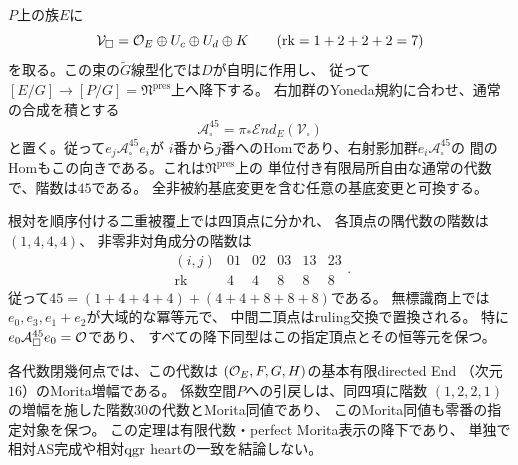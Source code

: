\begin{theorem}[無標識二形式商上の階数四十五のpointed有限代数]
\label{thm:qa-unordered-rank45-morita-descent}
$P$上の族$E$に
\[
 \mathcal V_\square
 =\mathcal O_E\oplus U_c\oplus U_d\oplus K
 \qquad (\operatorname{rk}=1+2+2+2=7)
\]
を取る。この束の$\widetilde G$線型化では$D$が自明に作用し、
従って$[E/G]\to[P/G]=\mathfrak N^{\mathrm{pres}}$上へ降下する。
右加群のYoneda規約に合わせ、通常の合成を積とする
\begin{equation}
 \mathcal A_\square^{45}
   =\pi_*\mathcal End_E(\mathcal V_\square)
 \label{eq:qa-rank45-ordinary-end}
\end{equation}
と置く。従って$e_j\mathcal A_\square^{45}e_i$が
$i$番から$j$番へのHomであり、右射影加群$e_i\mathcal A_\square^{45}$の
間のHomもこの向きである。これは$\mathfrak N^{\mathrm{pres}}$上の
単位付き有限局所自由な通常の代数で、階数は$45$である。
全非被約基底変更を含む任意の基底変更と可換する。

根対を順序付ける二重被覆上では四頂点に分かれ、
各頂点の隅代数の階数は$(1,4,4,4)$、
非零非対角成分の階数は
\[
 \begin{array}{c|ccccc}
 (i,j)&01&02&03&13&23\\\hline
 \operatorname{rk}&4&4&8&8&8
 \end{array}.
\]
従って$45=(1+4+4+4)+(4+4+8+8+8)$である。
無標識商上では$e_0,e_3,e_1+e_2$が大域的な冪等元で、
中間二頂点はruling交換で置換される。
特に$e_0\mathcal A_\square^{45}e_0=\mathcal O$であり、
すべての降下同型はこの指定頂点とその恒等元を保つ。

各代数閉幾何点では、この代数は
$(\mathcal O_E,F,G,H)$の基本有限directed End
（次元$16$）のMorita増幅である。
係数空間$P$への引戻しは、同四項に階数
$(1,2,2,1)$の増幅を施した階数$30$の代数とMorita同値であり、
このMorita同値も零番の指定対象を保つ。
この定理は有限代数・perfect Morita表示の降下であり、
単独で相対AS完成や相対$\operatorname{qgr}$ heartの一致を結論しない。
\end{theorem}
